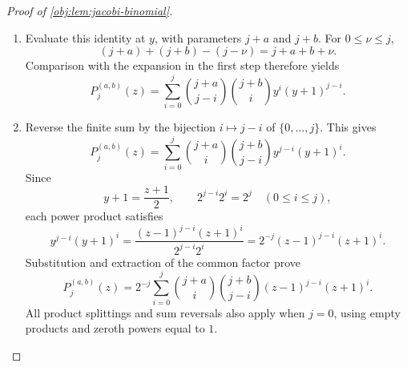 \begin{proof}[Proof of \cref{obj:lem:jacobi-binomial}]
\begin{enumerate}
The generalized Vandermonde convolution for falling-factorial coefficients states
\[
\binom{\gamma+\gamma_{\mathrm{aux}}}{\nu}
=
\sum_{i=0}^{\nu}\binom{\gamma}{i}\binom{\gamma_{\mathrm{aux}}}{\nu-i},
\qquad \nu\in\mathbb N_0.
\]

For \(0\le\nu\le j\), the terms with \(i>\nu\) contribute zero to the coefficient of \(\xi^\nu\) on the left. Expanding \((\xi+1)^{j-i}\), then applying the product identity and Vandermonde convolution, gives that coefficient as
\[
\begin{aligned}
\sum_{i=0}^{\nu}
\binom{\gamma}{j-i}\binom{\gamma_{\mathrm{aux}}}{i}\binom{j-i}{\nu-i}
&=
\binom{\gamma}{j-\nu}
\sum_{i=0}^{\nu}
\binom{\gamma_{\mathrm{aux}}}{i}\binom{\gamma-(j-\nu)}{\nu-i}\\
&=
\binom{\gamma}{j-\nu}
\binom{\gamma+\gamma_{\mathrm{aux}}-(j-\nu)}{\nu}.
\end{aligned}
\]
For \(\nu>j\), every \(0\le i\le j\) satisfies
\[
\nu-i>j-i,
\qquad
\binom{j-i}{\nu-i}=0.
\]
Hence the coefficient is zero on both sides. Equality of all coefficients proves the polynomial identity.

\item Evaluate this identity at \(y\), with parameters \(j+a\) and \(j+b\). For \(0\le\nu\le j\),
\[
(j+a)+(j+b)-(j-\nu)=j+a+b+\nu.
\]
Comparison with the expansion in the first step therefore yields
\[
P_j^{(a,b)}(z)
=
\sum_{i=0}^{j}
\binom{j+a}{j-i}\binom{j+b}{i}
y^i(y+1)^{j-i}.
\]

\item Reverse the finite sum by the bijection \(i\mapsto j-i\) of \(\{0,\ldots,j\}\). This gives
\[
P_j^{(a,b)}(z)
=
\sum_{i=0}^{j}
\binom{j+a}{i}\binom{j+b}{j-i}
y^{j-i}(y+1)^i.
\]
Since
\[
y+1=\frac{z+1}{2},
\qquad
2^{j-i}2^i=2^j
\quad(0\le i\le j),
\]
each power product satisfies
\[
y^{j-i}(y+1)^i
=
\frac{(z-1)^{j-i}(z+1)^i}{2^{j-i}2^i}
=
2^{-j}(z-1)^{j-i}(z+1)^i.
\]
Substitution and extraction of the common factor prove
\[
P_j^{(a,b)}(z)
=
2^{-j}\sum_{i=0}^{j}
\binom{j+a}{i}\binom{j+b}{j-i}
(z-1)^{j-i}(z+1)^i.
\]
All product splittings and sum reversals also apply when \(j=0\), using empty products and zeroth powers equal to \(1\).
\end{enumerate}
\end{proof}
